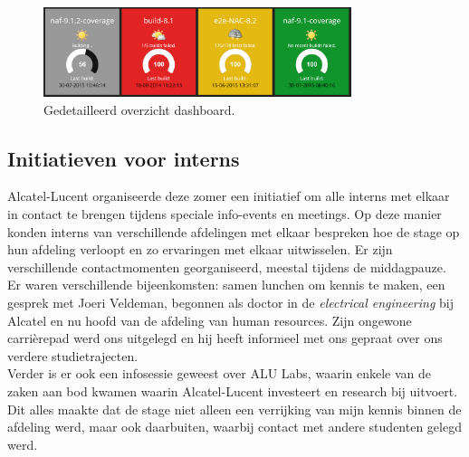 \documentclass[10pt,a4paper]{article}
\begin{document}
\begin{figure}[ht!]
\centering
\includegraphics[width=90mm]{screenshot2.png}
\caption{Gedetailleerd overzicht dashboard.} 
\label{dash_2}
\end{figure}

\subsection{Initiatieven voor interns}
\label{interns}
Alcatel-Lucent organiseerde deze zomer een initiatief om alle interns met elkaar in contact te brengen tijdens speciale info-events en meetings. Op deze manier konden interns van verschillende afdelingen met elkaar bespreken hoe de stage op hun afdeling verloopt en zo ervaringen met elkaar uitwisselen. Er zijn verschillende contactmomenten georganiseerd, meestal tijdens de middagpauze. Er waren verschillende bijeenkomsten: samen lunchen om kennis te maken, een gesprek met Joeri Veldeman, begonnen als doctor in de \textit{electrical engineering} bij Alcatel en nu hoofd van de afdeling van human resources. Zijn ongewone carri\`erepad werd ons uitgelegd en hij heeft informeel met ons gepraat over ons verdere studietrajecten.\\
Verder is er ook een infosessie geweest over ALU Labs, waarin enkele van de zaken aan bod kwamen waarin Alcatel-Lucent investeert en research bij uitvoert.\\
Dit alles maakte dat de stage niet alleen een verrijking van mijn kennis binnen de afdeling werd, maar ook daarbuiten, waarbij contact met andere studenten gelegd werd.
\end{document}
